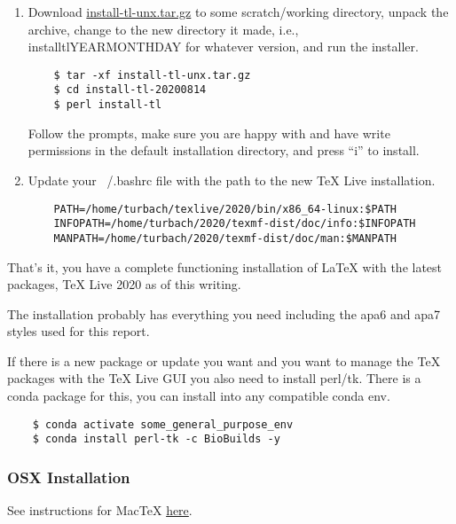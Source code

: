 \documentclass[helv,letter,doc,natbib,11pt]{apa6}  %
\begin{document}
\begin{enumerate}

\item Download \url{install-tl-unx.tar.gz} to some scratch/working
  directory, unpack the archive, change to the new directory it
  made, i.e., \mbox{install\textendash tl\textendash YEARMONTHDAY} for
  whatever version, and run the installer.

  \begin{verbatim}
    $ tar -xf install-tl-unx.tar.gz 
    $ cd install-tl-20200814
    $ perl install-tl
  \end{verbatim}

  Follow the prompts, make sure you are happy with and have write
  permissions in the default installation directory, and press ``i''
  to install.

\item Update your ~/.bashrc file with the path to the new TeX Live
  installation.

  \begin{verbatim}
    PATH=/home/turbach/texlive/2020/bin/x86_64-linux:$PATH
    INFOPATH=/home/turbach/2020/texmf-dist/doc/info:$INFOPATH
    MANPATH=/home/turbach/2020/texmf-dist/doc/man:$MANPATH
  \end{verbatim}

\end{enumerate}

That's it, you have a complete functioning installation of \LaTeX{}
with the latest packages, TeX Live 2020 as of this writing.

The installation probably has everything you need including the apa6
and apa7 styles used for this report.

If there is a new package or update you want and you want to manage
the TeX packages with the TeX Live GUI you also need to install
perl/tk. There is a conda package for this, you can install into any
compatible conda env.

  \begin{verbatim}
    $ conda activate some_general_purpose_env
    $ conda install perl-tk -c BioBuilds -y
  \end{verbatim}


\subsubsection{OSX Installation}

See instructions for MacTeX \href{https://www.tug.org/mactex/}{here}.
\end{document}
